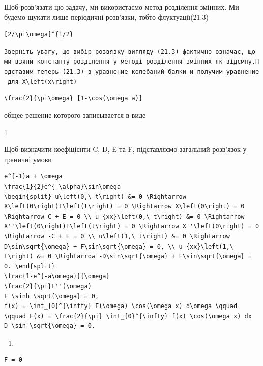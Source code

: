 \documentclass[
  ukrainian,
]{article}
\providecommand{\tightlist}{%
  \setlength{\itemsep}{0pt}\setlength{\parskip}{0pt}}
\begin{document}
Щоб розв'язати цю задачу, ми використаємо метод розділення змінних. Ми
будемо шукати лише періодичні розв'язки, тобто флуктуації(21.3)

\begin{verbatim}
[2/\pi\omega]^{1/2}
\end{verbatim}

\texttt{Зверніть\ увагу,\ що\ вибір\ розв\textquotesingle{}язку\ вигляду\ (21.3)\ фактично\ означає,\ що\ ми\ взяли\ константу\ розділення\ у\ методі\ розділення\ змінних\ як\ від\textquotesingle{}ємну.Подставим\ теперь\ (21.3)\ в\ уравнение\ колебаний\ балки\ и\ получим\ уравнение\ для\ \textquotesingle{}X\textbackslash{}left(x\textbackslash{}right)\textquotesingle{}}

\begin{verbatim}
\frac{2}{\pi\omega} [1-\cos(\omega a)]
\end{verbatim}

общее решение которого записывается в виде

1

Щоб визначити коефіцієнти C, D, E та F, підставляємо загальний розв'язок
у граничні умови

\begin{verbatim}
e^{-1}a + \omega
\frac{1}{2}e^{-\alpha}\sin\omega
\begin{split} u\left(0,\ t\right) &= 0 \Rightarrow X\left(0\right)T\left(t\right) = 0 \Rightarrow X\left(0\right) = 0 \Rightarrow C + E = 0 \\ u_{xx}\left(0,\ t\right) &= 0 \Rightarrow X''\left(0\right)T\left(t\right) = 0 \Rightarrow X''\left(0\right) = 0 \Rightarrow -C + E = 0 \\ u\left(1,\ t\right) &= 0 \Rightarrow D\sin\sqrt{\omega} + F\sin\sqrt{\omega} = 0, \\ u_{xx}\left(1,\ t\right) &= 0 \Rightarrow -D\sin\sqrt{\omega} + F\sin\sqrt{\omega} = 0. \end{split}
\frac{1-e^{-a\omega}}{\omega}
\frac{2}{\pi}F''(\omega)
F \sinh \sqrt{\omega} = 0,
f(x) = \int_{0}^{\infty} F(\omega) \cos(\omega x) d\omega \qquad \qquad F(x) = \frac{2}{\pi} \int_{0}^{\infty} f(x) \cos(\omega x) dx
D \sin \sqrt{\omega} = 0.
\end{verbatim}

\begin{enumerate}
\def\labelenumi{\arabic{enumi}.}
\tightlist
\item
\end{enumerate}

\begin{verbatim}
F = 0
\end{verbatim}
\end{document}
